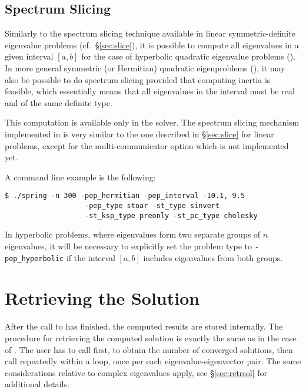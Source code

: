 \subsection{\label{sec:qslice}Spectrum Slicing}

Similarly to the spectrum slicing technique available in linear symmetric-definite eigenvalue problems (cf.\ \S\ref{sec:slice}), it is possible to compute all eigenvalues in a given interval $[a,b]$ for the case of hyperbolic quadratic eigenvalue problems (). In more general symmetric (or Hermitian) quadratic eigenproblems (), it may also be possible to do spectrum slicing provided that computing inertia is feasible, which essentially means that all eigenvalues in the interval must be real and of the same definite type.

This computation is available only in the  solver.
The spectrum slicing mechanism implemented in  is very similar to the one described in \S\ref{sec:slice} for linear problems, except for the multi-communicator option which is not implemented yet.

A command line example is the following:
\begin{Verbatim}[fontsize=\small]
	$ ./spring -n 300 -pep_hermitian -pep_interval -10.1,-9.5
                   -pep_type stoar -st_type sinvert
                   -st_ksp_type preonly -st_pc_type cholesky
\end{Verbatim}

In hyperbolic problems, where eigenvalues form two separate groups of $n$ eigenvalues, it will be necessary to explicitly set the problem type to \texttt{-pep\_hyperbolic} if the interval $[a,b]$ includes eigenvalues from both groups.

\section{Retrieving the Solution}

After the call to  has finished, the computed results are stored internally. The procedure for retrieving the computed solution is exactly the same as in the case of . The user has to call  first, to obtain the number of converged solutions, then call  repeatedly within a loop, once per each eigenvalue-eigenvector pair. The same considerations relative to complex eigenvalues apply, see \S\ref{sec:retrsol} for additional details.

